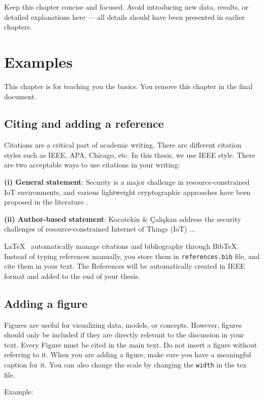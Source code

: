 \documentclass[12pt]{report}
\begin{document}
Keep this chapter concise and focused. Avoid introducing new data, results, or detailed explanations here — all details should have been presented in earlier chapters.


\chapter{Examples}

This chapter is for teaching you the basics. You remove this chapter in the final document.

\section{Citing and adding a reference}

Citations are a critical part of academic writing. There are different citation styles such as IEEE, APA, Chicago, etc. In this thesis, we use IEEE style. There are two acceptable ways to use citations in your writing:

\textbf{(i) General statement}: Security is a major challenge in resource-constrained IoT environments, and various lightweight cryptographic approaches have been proposed in the literature \cite{kocatekin2023adaptation}.


\textbf{(ii) Author-based statement}: Kocatekin \& Çalışkan \cite{kocatekin2023adaptation} address the security challenges of resource-constrained Internet of Things (IoT) ...


\LaTeX~ automatically manage citations and bibliography through BibTeX. Instead of typing references manually, you store them in \verb|references.bib| file, and cite them in your text. The References will be automatically created in IEEE format and added to the end of your thesis.



\section{Adding a figure}

Figures are useful for visualizing data, models, or concepts. However, figures should only be included if they are directly relevant to the discussion in your text. Every Figure must be cited in the main text. Do not insert a figure without referring to it. When you are adding a figure, make sure you have a meaningful caption for it. You can also change the scale by changing the \verb|width| in the tex file. 

Example: 
\end{document}
